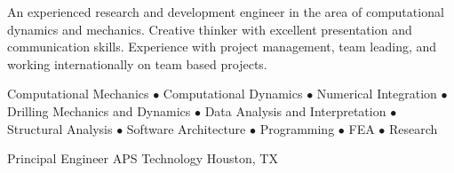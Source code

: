 \documentclass{resume}
\begin{document}
	\thispagestyle{lefooterhorizontalline}
	\makeresumeheaderB
	
	An experienced research and development engineer in the area of computational dynamics and mechanics. Creative thinker with excellent presentation and communication skills. Experience with project management, team leading, and working internationally on team based projects.

	Computational Mechanics $\bullet$ Computational Dynamics $\bullet$ Numerical Integration $\bullet$ Drilling Mechanics and Dynamics $\bullet$ Data Analysis and Interpretation $\bullet$ Structural Analysis $\bullet$ Software Architecture $\bullet$ Programming $\bullet$ FEA $\bullet$ Research

    
            {Principal Engineer}
            {APS Technology}
			{Houston, TX}
			
\end{document}
